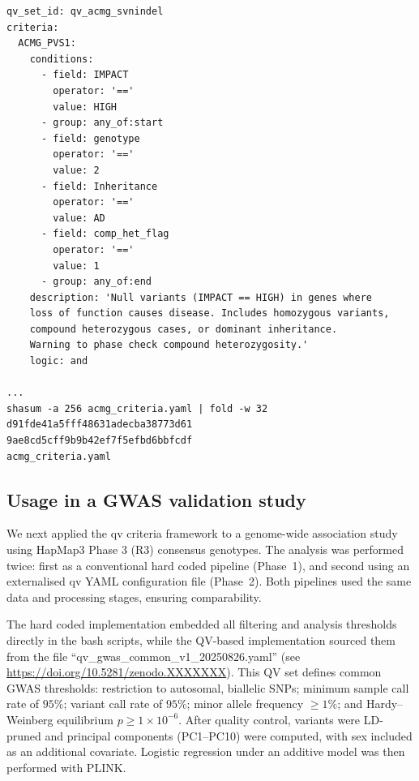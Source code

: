 \begin{tcolorbox}[
    colback=white!0,
    colframe=black,
    boxrule=1pt,
    arc=1mm,
    outer arc=1mm,
    title=\textbf{\refstepcounter{myboxcounter}\label{box:acmg_criteria_yaml}Box \themyboxcounter: qv\_files/acmg\_criteria.yaml}
]
\begin{verbatim}
qv_set_id: qv_acmg_svnindel
criteria:
  ACMG_PVS1:
    conditions:
      - field: IMPACT
        operator: '=='
        value: HIGH
      - group: any_of:start
      - field: genotype
        operator: '=='
        value: 2
      - field: Inheritance
        operator: '=='
        value: AD
      - field: comp_het_flag
        operator: '=='
        value: 1
      - group: any_of:end
    description: 'Null variants (IMPACT == HIGH) in genes where 
    loss of function causes disease. Includes homozygous variants, 
    compound heterozygous cases, or dominant inheritance.
    Warning to phase check compound heterozygosity.'
    logic: and

...
shasum -a 256 acmg_criteria.yaml | fold -w 32
d91fde41a5fff48631adecba38773d61
9ae8cd5cff9b9b42ef7f5efbd6bbfcdf
acmg_criteria.yaml
\end{verbatim}
\end{tcolorbox}


\subsection{Usage in a GWAS validation study}

We next applied the \ac{qv} criteria framework to a genome-wide association study using HapMap3 Phase 3 (R3) consensus genotypes. The analysis was performed twice: first as a conventional hard coded pipeline (Phase~1), and second using an externalised \ac{qv} YAML configuration file (Phase~2). Both pipelines used the same data and processing stages, ensuring comparability.  

The hard coded implementation embedded all filtering and analysis thresholds directly in the bash scripts, while the QV-based implementation sourced them from the file ``qv\_gwas\_common\_v1\_20250826.yaml'' (see \url{https://doi.org/10.5281/zenodo.XXXXXXX}). This QV set defines common GWAS thresholds: restriction to autosomal, biallelic SNPs; minimum sample call rate of $95\%$; variant call rate of $95\%$; minor allele frequency $\geq 1\%$; and Hardy–Weinberg equilibrium $p \geq 1\times10^{-6}$. After quality control, variants were LD-pruned and principal components (PC1–PC10) were computed, with sex included as an additional covariate. Logistic regression under an additive model was then performed with PLINK.  

